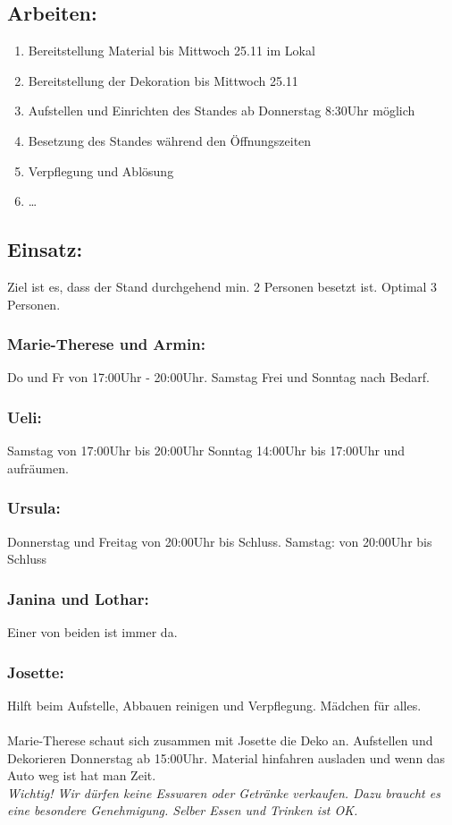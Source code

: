 \documentclass{mybib}
\begin{document}
\subsection{Arbeiten:}
\begin{enumerate}
  \item Bereitstellung Material bis Mittwoch 25.11 im Lokal
  \item Bereitstellung der Dekoration bis Mittwoch 25.11
  \item Aufstellen und Einrichten des Standes ab Donnerstag 8:30Uhr möglich
  \item Besetzung des Standes während den Öffnungszeiten
  \item Verpflegung und Ablösung
  \item …
\end{enumerate}
\subsection{Einsatz:}
Ziel ist es, dass der Stand durchgehend min. 2 Personen besetzt ist. Optimal 3 Personen.
\subsubsection{Marie-Therese und Armin:}
Do und Fr von 17:00Uhr - 20:00Uhr. Samstag Frei und Sonntag nach Bedarf.
\subsubsection{Ueli:}
Samstag von 17:00Uhr bis 20:00Uhr Sonntag 14:00Uhr bis 17:00Uhr und aufräumen.
\subsubsection{Ursula:}
Donnerstag und Freitag von 20:00Uhr bis Schluss. Samstag: von 20:00Uhr bis Schluss
\subsubsection{Janina und Lothar:}
Einer von beiden ist immer da.
\subsubsection{Josette:}
Hilft beim Aufstelle, Abbauen reinigen und Verpflegung. Mädchen für alles.
\\
\\
Marie-Therese schaut sich zusammen mit Josette die Deko an. Aufstellen und Dekorieren Donnerstag ab 15:00Uhr. Material hinfahren ausladen und wenn das Auto weg ist hat man Zeit.\\
\textit{Wichtig! Wir dürfen keine Esswaren oder Getränke verkaufen. Dazu braucht es eine besondere Genehmigung. Selber Essen und Trinken ist OK.}
\end{document}
